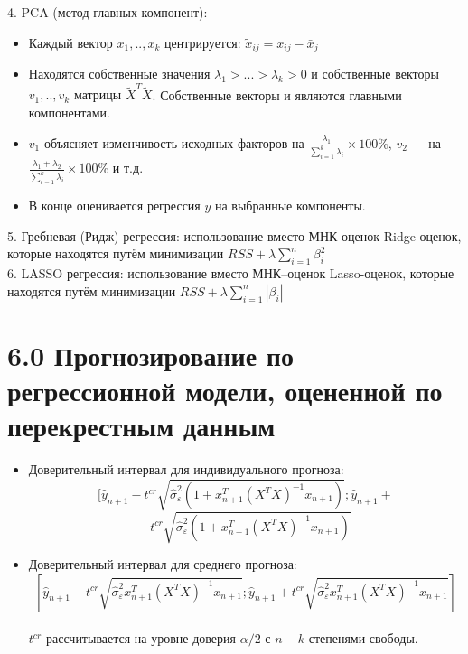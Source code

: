 \documentclass[a0,final]{a0poster}
\begin{document}
\begin{multicols}{4}
4. PCA (метод главных компонент):
\begin{itemize}
\item {Каждый вектор $x_1,..,x_k$ центрируется: $\tilde{x}_{ij}=x_{ij}-\bar{x}_{j}$}
\item {Находятся собственные значения $\lambda_1>...>\lambda_k>0$ и собственные векторы $v_1,..,v_k$ матрицы $\tilde{X}^T\tilde{X}$}. Собственные векторы и являются главными компонентами.
\item {$v_1$ объясняет изменчивость исходных факторов на $\frac{\lambda_1}{\sum\limits_{i=1}^{k}\lambda_i}\times 100\%$, $v_2$ — на $\frac{\lambda_1+\lambda_2}{\sum\limits_{i=1}^{k}\lambda_i}\times 100\%$ и т.д.}
\item {В конце оценивается регрессия $y$ на выбранные компоненты.}
\end{itemize}
5. Гребневая (Ридж) регрессия: использование вместо МНК-оценок Ridge-оценок, которые находятся путём минимизации $RSS + \lambda\sum\limits_{i=1}^{n}\beta_i^2 $ \\
6. LASSO регрессия: использование вместо МНК--оценок Lasso-оценок, которые находятся путём минимизации $RSS + \lambda\sum\limits_{i=1}^{n}|\beta_i| $ \\

\section*{6.0 Прогнозирование по регрессионной модели, оцененной по перекрестным данным}
\begin{itemize}
\item{Доверительный интервал для индивидуального прогноза:}\\
\[[\hat{y}_{n+1} - t^{cr}\sqrt{\hat{\sigma}^2_\varepsilon(1+
x^T_{n+1}{(X^TX)}^{-1}x_{n+1})}; \hat{y}_{n+1} + \]
\[+ t^{cr}\sqrt{\hat{\sigma}^2_\varepsilon(1+
x^T_{n+1}{(X^TX)}^{-1}x_{n+1})} \]

\item{Доверительный интервал для среднего прогноза:}\\
\[[\hat{y}_{n+1} - t^{cr}\sqrt{\hat{\sigma}^2_\varepsilon x^T_{n+1}{(X^TX)}^{-1}x_{n+1}}; \hat{y}_{n+1} + t^{cr}\sqrt{\hat{\sigma}^2_\varepsilon x^T_{n+1}{(X^TX)}^{-1}x_{n+1}}] \]
\\
$t^{cr}$ рассчитывается на уровне доверия $\alpha/2$ с $n-k$ степенями свободы.
\end{itemize}
\onehalfspacing

\end{multicols}
\end{document}
